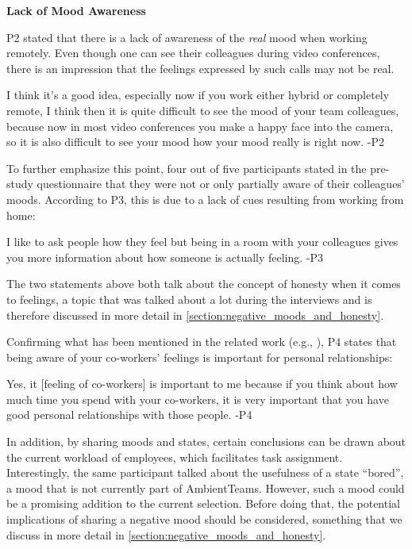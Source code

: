 \bigskip\noindent\textbf{Lack of Mood Awareness}

\medskip\noindent P2 stated that there is a lack of awareness of the \textit{real} mood when working remotely. Even though one can see their colleagues during video conferences, there is an impression that the feelings expressed by such calls may not be real.

\begin{displayquote}
    I think it's a good idea, especially now if you work either hybrid or completely remote, I think then it is quite difficult to see the mood of your team colleagues, because now in most video conferences you make a happy face into the camera, so it is also difficult to see your mood how your mood really is right now. -P2
\end{displayquote}

To further emphasize this point, four out of five participants stated in the pre-study questionnaire that they were not or only partially aware of their colleagues' moods. According to P3, this is due to a lack of cues resulting from working from home:

\begin{displayquote}
    I like to ask people how they feel but being in a room with your colleagues gives you more information about how someone is actually feeling. -P3
\end{displayquote}

The two statements above both talk about the concept of honesty when it comes to feelings, a topic that was talked about a lot during the interviews and is therefore discussed in more detail in \autoref{section:negative_moods_and_honesty}.

Confirming what has been mentioned in the related work (e.g., \autocite{grant2013exploration, kuwabara2002connectedness}), P4 states that being aware of your co-workers' feelings is important for personal relationships:

\begin{displayquote}
    Yes, it [feeling of co-workers] is important to me because if you think about how much time you spend with your co-workers, it is very important that you have good personal relationships with those people. -P4
\end{displayquote}

In addition, by sharing moods and states, certain conclusions can be drawn about the current workload of employees, which facilitates task assignment. Interestingly, the same participant talked about the usefulness of a state \enquote{bored}, a mood that is not currently part of AmbientTeams. However, such a mood could be a promising addition to the current selection. Before doing that, the potential implications of sharing a negative mood should be considered, something that we discuss in more detail in \autoref{section:negative_moods_and_honesty}.

